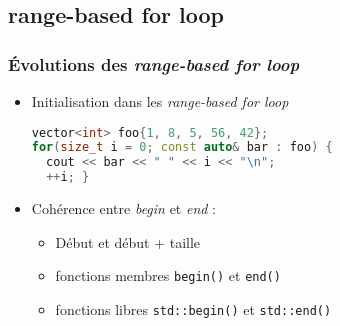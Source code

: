 \documentclass[C++.tex]{subfiles}
\begin{document}
\subsection*{range-based for loop}
\begin{frame}[fragile]
	\frametitle{Évolutions des \textit{range-based for loop}}
	\begin{itemize}
		\item Initialisation dans les \textit{range-based for loop}

		\begin{lstlisting}[language=C++]
vector<int> foo{1, 8, 5, 56, 42};
for(size_t i = 0; const auto& bar : foo) {
  cout << bar << " " << i << "\n";
  ++i; }\end{lstlisting}

		\item Cohérence entre \textit{begin} et \textit{end} :
		\begin{itemize}
			\item \og Début\fg{} et \og début + taille\fg{}
			\item fonctions membres \lstinline|begin()| et \lstinline|end()|
			\item fonctions libres \lstinline|std::begin()| et \lstinline|std::end()|
		\end{itemize}

	\end{itemize}
\end{frame}
\end{document}
